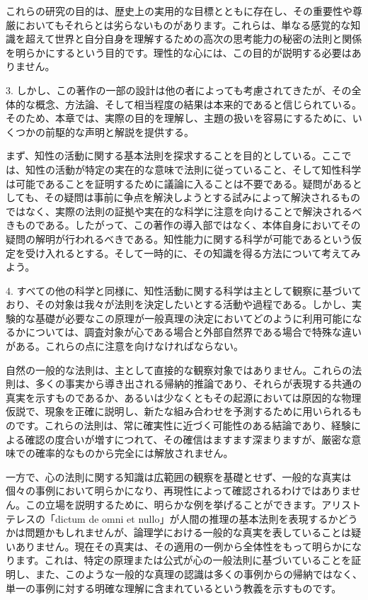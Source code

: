 \documentclass[a4paper,11pt,openany]{ltjsbook}
\begin{document}
これらの研究の目的は、歴史上の実用的な目標とともに存在し、その重要性や尊厳においてもそれらとは劣らないものがあります。これらは、単なる感覚的な知識を超えて世界と自分自身を理解するための高次の思考能力の秘密の法則と関係を明らかにするという目的です。理性的な心には、この目的が説明する必要はありません。

3. しかし、この著作の一部の設計は他の者によっても考慮されてきたが、その全体的な概念、方法論、そして相当程度の結果は本来的であると信じられている。そのため、本章では、実際の目的を理解し、主題の扱いを容易にするために、いくつかの前駆的な声明と解説を提供する。

まず、知性の活動に関する基本法則を探求することを目的としている。ここでは、知性の活動が特定の実在的な意味で法則に従っていること、そして知性科学は可能であることを証明するために議論に入ることは不要である。疑問があるとしても、その疑問は事前に争点を解決しようとする試みによって解決されるものではなく、実際の法則の証拠や実在的な科学に注意を向けることで解決されるべきものである。したがって、この著作の導入部ではなく、本体自身においてその疑問の解明が行われるべきである。知性能力に関する科学が可能であるという仮定を受け入れるとする。そして一時的に、その知識を得る方法について考えてみよう。

4. すべての他の科学と同様に、知性活動に関する科学は主として観察に基づいており、その対象は我々が法則を決定したいとする活動や過程である。しかし、実験的な基礎が必要なこの原理が一般真理の決定においてどのように利用可能になるかについては、調査対象が心である場合と外部自然界である場合で特殊な違いがある。これらの点に注意を向けなければならない。

自然の一般的な法則は、主として直接的な観察対象ではありません。これらの法則は、多くの事実から導き出される帰納的推論であり、それらが表現する共通の真実を示すものであるか、あるいは少なくともその起源においては原因的な物理仮説で、現象を正確に説明し、新たな組み合わせを予測するために用いられるものです。これらの法則は、常に確実性に近づく可能性のある結論であり、経験による確認の度合いが増すにつれて、その確信はますます深まりますが、厳密な意味での確率的なものから完全には解放されません。

一方で、心の法則に関する知識は広範囲の観察を基礎とせず、一般的な真実は個々の事例において明らかになり、再現性によって確認されるわけではありません。この立場を説明するために、明らかな例を挙げることができます。アリストテレスの「dictum de omni et nullo」が人間の推理の基本法則を表現するかどうかは問題かもしれませんが、論理学における一般的な真実を表していることは疑いありません。現在その真実は、その適用の一例から全体性をもって明らかになります。これは、特定の原理または公式が心の一般法則に基づいていることを証明し、また、このような一般的な真理の認識は多くの事例からの帰納ではなく、単一の事例に対する明確な理解に含まれているという教義を示すものです。
\end{document}
